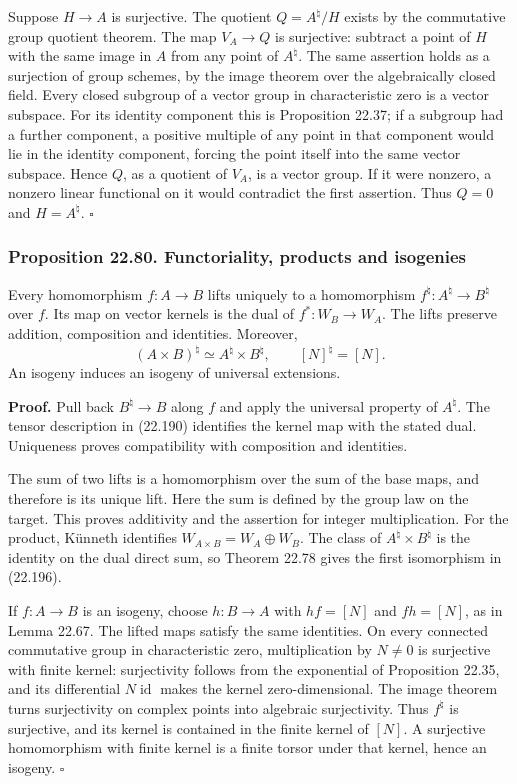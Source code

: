 \documentclass[
  11pt,
  a4paper,
]{article}
\begin{document}
Suppose \(H\to A\) is surjective. The quotient \(Q=A^\natural/H\) exists
by the commutative group quotient theorem. The map \(V_A\to Q\) is
surjective: subtract a point of \(H\) with the same image in \(A\) from
any point of \(A^\natural\). The same assertion holds as a surjection of
group schemes, by the image theorem over the algebraically closed field.
Every closed subgroup of a vector group in characteristic zero is a
vector subspace. For its identity component this is Proposition 22.37;
if a subgroup had a further component, a positive multiple of any point
in that component would lie in the identity component, forcing the point
itself into the same vector subspace. Hence \(Q\), as a quotient of
\(V_A\), is a vector group. If it were nonzero, a nonzero linear
functional on it would contradict the first assertion. Thus \(Q=0\) and
\(H=A^\natural\). \(\square\)

\subsubsection{Proposition 22.80. Functoriality, products and
isogenies}\label{proposition-22.80.-functoriality-products-and-isogenies}

Every homomorphism \(f:A\to B\) lifts uniquely to a homomorphism
\(f^\natural:A^\natural\to B^\natural\) over \(f\). Its map on vector
kernels is the dual of \(f^*:W_B\to W_A\). The lifts preserve addition,
composition and identities. Moreover, \[
 (A\times B)^\natural\simeq A^\natural\times B^\natural,
 \qquad [N]^\natural=[N].
 \tag{22.196}
\] An isogeny induces an isogeny of universal extensions.

\textbf{Proof.} Pull back \(B^\natural\to B\) along \(f\) and apply the
universal property of \(A^\natural\). The tensor description in (22.190)
identifies the kernel map with the stated dual. Uniqueness proves
compatibility with composition and identities.

The sum of two lifts is a homomorphism over the sum of the base maps,
and therefore is its unique lift. Here the sum is defined by the group
law on the target. This proves additivity and the assertion for integer
multiplication. For the product, Künneth identifies
\(W_{A\times B}=W_A\oplus W_B\). The class of
\(A^\natural\times B^\natural\) is the identity on the dual direct sum,
so Theorem 22.78 gives the first isomorphism in (22.196).

If \(f:A\to B\) is an isogeny, choose \(h:B\to A\) with \(hf=[N]\) and
\(fh=[N]\), as in Lemma 22.67. The lifted maps satisfy the same
identities. On every connected commutative group in characteristic zero,
multiplication by \(N\ne0\) is surjective with finite kernel:
surjectivity follows from the exponential of Proposition 22.35, and its
differential \(N\operatorname{id}\) makes the kernel zero-dimensional.
The image theorem turns surjectivity on complex points into algebraic
surjectivity. Thus \(f^\natural\) is surjective, and its kernel is
contained in the finite kernel of \([N]\). A surjective homomorphism
with finite kernel is a finite torsor under that kernel, hence an
isogeny. \(\square\)
\end{document}
